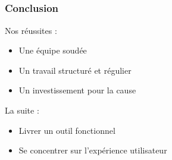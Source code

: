 


\subsection{} %

\speaker{\Pierre}
\begin{frame}
\frametitle{Conclusion}
	Nos réussites :
	\begin{itemize}
		\item Une équipe soudée
		\item Un travail structuré et régulier
		\item Un investissement pour la cause
	\end{itemize}
	
	La suite : 
	\begin{itemize}
		\item Livrer un outil fonctionnel
		\item Se concentrer sur l’expérience utilisateur
	\end{itemize}
\end{frame}
